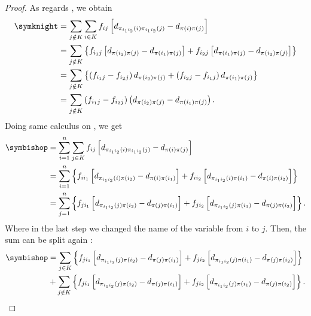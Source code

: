 \begin{proof}
	As regards \symknight , we obtain 
	\begin{equation}
	\label{eq:teoremaDeltaparte1}
	\begin{split}
	\symknight &=\sum_{j\notin K}  \sum_{i  \in K } f_{ij}\left[d_{\pi_{i_1i_2}(i)\pi_{i_1i_2}(j)}-d_{\pi(i)\pi(j)}\right]\\
	&=\sum_{j\notin K} \left\{f_{i_1j}\left[d_{\pi(i_2)\pi(j)}-d_{\pi(i_1)\pi(j)}\right]+f_{i_2j}\left[d_{\pi(i_1)\pi(j)}-d_{\pi(i_2)\pi(j)}\right]\right\} \\
	&=\sum_{j\notin K} \left\{
	\left(f_{i_1j}-f_{i_2j}\right)d_{\pi(i_2)\pi(j)} 
	+
	\left(f_{i_2j}-f_{i_1j}\right)d_{\pi(i_1)\pi(j)}\right\} \\
	&=\sum_{j\notin K} 
	\left(f_{i_1j}-f_{i_2j}\right)\left(d_{\pi(i_2)\pi(j)}-d_{\pi(i_1)\pi(j)} \right).
	\end{split}
	\end{equation}
	Doing same calculus on \symbishop, we get
	\begin{equation}
	\label{eq:teoremaDeltaparte2}
	\begin{split}
	\symbishop &=\sum_{i=1}^n  \sum_{j  \in K } f_{ij}\left[d_{\pi_{i_1i_2}(i)\pi_{i_1i_2}(j)}-d_{\pi(i)\pi(j)}\right]\\
	&=\sum_{i=1}^n \left\{f_{ii_1}\left[d_{\pi_{i_1i_2}(i)\pi(i_2)}-d_{\pi(i)\pi(i_1)}\right]
	+
	f_{ii_2}\left[d_{\pi_{i_1i_2}(i)\pi(i_1)}-d_{\pi(i)\pi(i_2)}\right]\right\} \\
	&=\sum_{j=1}^n \left\{f_{ji_1}\left[d_{\pi_{i_1i_2}(j)\pi(i_2)}-d_{\pi(j)\pi(i_1)}\right]
	+
	f_{ji_2}\left[d_{\pi_{i_1i_2}(j)\pi(i_1)}-d_{\pi(j)\pi(i_2)}\right]\right\}. \\
	\end{split}
	\end{equation}
	Where in the last step we changed the name of the variable from $i$ to $j$.
	Then, the sum can be split again :
	\begin{equation}
	\begin{split}
	\symbishop &= 
	\sum_{j\in K}
	\left\{f_{ji_1}\left[d_{\pi_{i_1i_2}(j)\pi(i_2)}-d_{\pi(j)\pi(i_1)}\right]
	+
	f_{ji_2}\left[d_{\pi_{i_1i_2}(j)\pi(i_1)}-d_{\pi(j)\pi(i_2)}\right]\right\} \\
	&+ \sum_{j \notin K} \left\{f_{ji_1}\left[d_{\pi_{i_1i_2}(j)\pi(i_2)}-d_{\pi(j)\pi(i_1)}\right]
	+
	f_{ji_2}\left[d_{\pi_{i_1i_2}(j)\pi(i_1)}-d_{\pi(j)\pi(i_2)}\right]\right\}.
	\end{split}
	\end{equation}
	

\end{proof}
